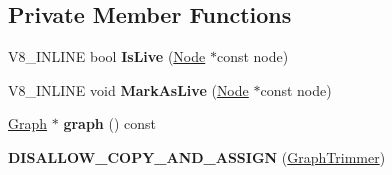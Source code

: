 \subsection*{Private Member Functions}
\begin{DoxyCompactItemize}
\item 
V8\+\_\+\+I\+N\+L\+I\+NE bool {\bfseries Is\+Live} (\hyperlink{classv8_1_1internal_1_1compiler_1_1_node}{Node} $\ast$const node)\hypertarget{classv8_1_1internal_1_1compiler_1_1_graph_trimmer_a32fcdb97d18aedce6ab9913d10e32336}{}\label{classv8_1_1internal_1_1compiler_1_1_graph_trimmer_a32fcdb97d18aedce6ab9913d10e32336}

\item 
V8\+\_\+\+I\+N\+L\+I\+NE void {\bfseries Mark\+As\+Live} (\hyperlink{classv8_1_1internal_1_1compiler_1_1_node}{Node} $\ast$const node)\hypertarget{classv8_1_1internal_1_1compiler_1_1_graph_trimmer_acdaf83c5a6d2f6bb6ed9c5f3ea14eee8}{}\label{classv8_1_1internal_1_1compiler_1_1_graph_trimmer_acdaf83c5a6d2f6bb6ed9c5f3ea14eee8}

\item 
\hyperlink{classv8_1_1internal_1_1compiler_1_1_graph}{Graph} $\ast$ {\bfseries graph} () const \hypertarget{classv8_1_1internal_1_1compiler_1_1_graph_trimmer_adbc04bc5f31a8d8c61160437696aa1d2}{}\label{classv8_1_1internal_1_1compiler_1_1_graph_trimmer_adbc04bc5f31a8d8c61160437696aa1d2}

\item 
{\bfseries D\+I\+S\+A\+L\+L\+O\+W\+\_\+\+C\+O\+P\+Y\+\_\+\+A\+N\+D\+\_\+\+A\+S\+S\+I\+GN} (\hyperlink{classv8_1_1internal_1_1compiler_1_1_graph_trimmer}{Graph\+Trimmer})\hypertarget{classv8_1_1internal_1_1compiler_1_1_graph_trimmer_a7bc5aa7f5e45c86867426494170b8b7f}{}\label{classv8_1_1internal_1_1compiler_1_1_graph_trimmer_a7bc5aa7f5e45c86867426494170b8b7f}

\end{DoxyCompactItemize}
